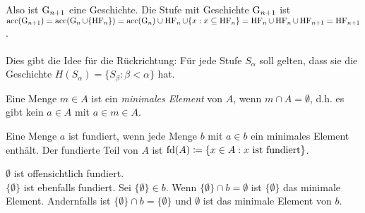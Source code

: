 Also ist $\operatorname{G}_{n+1}$ eine Geschichte. Die Stufe mit Geschichte $\operatorname{G}_{n+1}$ ist $\operatorname{acc}(\operatorname{G}_{n+1})=\operatorname{acc}(\operatorname{G}_n\cup \{\operatorname{HF}_n\})=\operatorname{acc}(\operatorname{G}_n)\cup \operatorname{HF}_n \cup \{x : x\subseteq \operatorname{HF}_n\}=\operatorname{HF}_n\cup \operatorname{HF}_n \cup \operatorname{HF}_{n+1} = \operatorname{HF}_{n+1}$.
\\
\\
Dies gibt die Idee für die Rückrichtung: Für jede Stufe $S_\alpha$ soll gelten, dass sie die Geschichte $H(S_\alpha)=\{S_\beta : \beta < \alpha\}$ hat.

\begin{definition}
	Eine Menge $m\in A$ ist ein \textit{minimales Element} von $A$, wenn $m\cap A=\emptyset$, d.h. es gibt kein $a\in A$ mit $a\in m \in A$.
\end{definition}	

\begin{definition}
	Eine Menge $a$ ist fundiert, wenn jede Menge $b$ mit $a\in b$ ein minimales Element enthält. Der fundierte Teil von $A$ ist $\operatorname{fd}(A)\coloneqq\{x\in A : x \text{ ist fundiert}\}$.
\end{definition}

\begin{example}
	$\emptyset$ ist offensichtlich fundiert.
	\\
	$\{\emptyset\}$ ist ebenfalls fundiert. Sei $\{\emptyset\}\in b$. Wenn $\{\emptyset\}\cap b =\emptyset$ ist $\{\emptyset\}$ das minimale Element. Andernfalls ist $\{\emptyset\}\cap b=\{\emptyset\}$ und $\emptyset$ ist das minimale Element von $b$.
\end{example}

